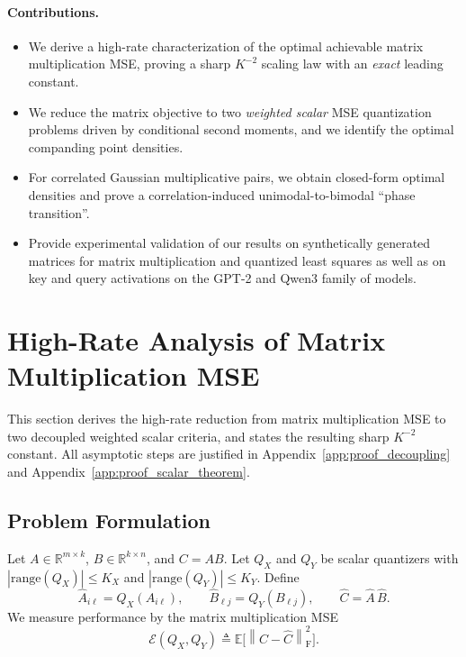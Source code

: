 \documentclass{article}
\newcommand{\E}{\mathbb{E}}
\newcommand{\R}{\mathbb{R}}
\newcommand{\F}{\mathrm{F}}
\newcommand{\norm}[1]{\left\lVert #1 \right\rVert}
\newcommand{\abs}[1]{\left\lvert #1 \right\rvert}
\newcommand{\defeq}{\triangleq}
\begin{document}
\paragraph*{Contributions.}
\begin{itemize}
\item We derive a high-rate characterization of the optimal achievable matrix multiplication MSE, proving a sharp $K^{-2}$ scaling law with an \emph{exact} leading constant.
\item We reduce the matrix objective to two \emph{weighted scalar} MSE quantization problems driven by conditional second moments, and we identify the optimal companding point densities.
\item For correlated Gaussian multiplicative pairs, we obtain closed-form optimal densities and prove a correlation-induced unimodal-to-bimodal ``phase transition''.
\item Provide experimental validation of our results on synthetically generated matrices for matrix multiplication and quantized least squares as well as on key and query activations on the GPT-2 and Qwen3 family of models.
\end{itemize}

\section{High-Rate Analysis of Matrix Multiplication MSE}\label{sec:highrate_from_scratch}

This section derives the high-rate reduction from matrix multiplication MSE to two decoupled weighted scalar criteria, and states the resulting sharp $K^{-2}$ constant. All asymptotic steps are justified in Appendix~\ref{app:proof_decoupling} and Appendix~\ref{app:proof_scalar_theorem}.

\subsection{Problem Formulation}

Let $A\in\R^{m\times k}$, $B\in\R^{k\times n}$, and $C=AB$. Let $Q_X$ and $Q_Y$ be scalar quantizers with $\abs{\mathrm{range}(Q_X)}\le K_X$ and $\abs{\mathrm{range}(Q_Y)}\le K_Y$. Define
\[
\widehat A_{i\ell}=Q_X(A_{i\ell}),\qquad
\widehat B_{\ell j}=Q_Y(B_{\ell j}),\qquad
\widehat C=\widehat A\,\widehat B.
\]
We measure performance by the matrix multiplication MSE
\[
\mathcal{E}(Q_X,Q_Y)\defeq \E\big[\norm{C-\widehat C}_\F^2\big].
\]
\end{document}
